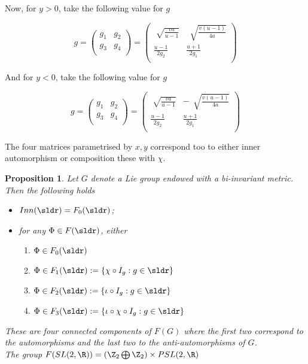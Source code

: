 \documentclass[11pt]{amsart}
\theoremstyle{plain}
\newtheorem{prop}[thm]{Proposition}
\theoremstyle{definition}
\theoremstyle{remark}
\begin{document}
\begin{itemize}
        \subitem Now, for $y>0$, take the following value for $g$
       
           \[g=\left( {\begin{array}{cc}
   g_1 & g_2 \\
   g_3 & g_4 \\
  \end{array} } \right)=\left( {\begin{array}{cc}
    \sqrt[]{\frac{va}{u-1}} &  \, \sqrt[]{\frac{v(u-1)}{4a}} \\
   \frac{u-1}{2g_2} & \frac{u+1}{2g_1} \\
  \end{array} } \right)
\]


        \subitem And for $y<0$, take the following value for $g$
              
               \[g=\left( {\begin{array}{cc}
   g_1 & g_2 \\
   g_3 & g_4 \\
  \end{array} } \right)=\left( {\begin{array}{cc}
    \sqrt[]{\frac{va}{u-1}} & - \, \sqrt[]{\frac{v(u-1)}{4a}} \\
   \frac{u-1}{2g_2} & \frac{u+1}{2g_1} \\
  \end{array} } \right)
\]   
    
The four matrices parametrised by $x,y$ correspond too to either inner automorphism or composition these with $\chi$.
    
\end{itemize}


\begin{prop} \label{isometries} Let $G$ denote a Lie group endowed with a bi-invariant metric. Then the following holds
\begin{itemize}
\item  $Inn(\sldr) = F_0(\sldr)$;
\item for any $\Phi \in F(\sldr)$, either
\begin{enumerate}

\item $\Phi \in F_0(\sldr)$ 
\item $\Phi \in F_1(\sldr):= \{\chi \circ I_g: g \in \sldr \}$ 
\item $\Phi \in F_2(\sldr):= \{\iota \circ I_g: g \in \sldr \}$ 
\item $\Phi \in F_3(\sldr):= \{\iota \circ \chi \circ I_g: g \in \sldr\}$ 

\end{enumerate}
\end{itemize}

These are four connected components of $F(G)$ where the first two correspond to the automorphisms and the last two to the anti-automorphisms of $G$.\\

The group $F(SL(2,\R))=(\Z_2 \bigoplus \Z_2) \times PSL(2,\R)$

\end{prop}
\end{document}
